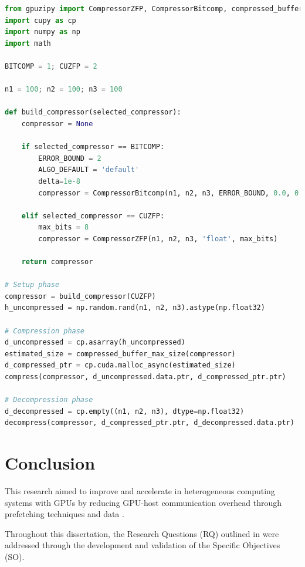 \documentclass[Ingles]{ic-tese-v3}
\begin{document}
\begin{minipage}{\linewidth}
\begin{lstlisting}[language=Python, caption={Example of using GPUZIPY to compress data on the GPU}, label={lst:gpuzipy}]
from gpuzipy import CompressorZFP, CompressorBitcomp, compressed_buffer_size, compressed_buffer_max_size, compress, decompress
import cupy as cp
import numpy as np
import math

BITCOMP = 1; CUZFP = 2

n1 = 100; n2 = 100; n3 = 100

def build_compressor(selected_compressor):
    compressor = None

    if selected_compressor == BITCOMP: 
        ERROR_BOUND = 2
        ALGO_DEFAULT = 'default'
        delta=1e-8
        compressor = CompressorBitcomp(n1, n2, n3, ERROR_BOUND, 0.0, 0.0, delta, 'float', ALGO_DEFAULT)
    
    elif selected_compressor == CUZFP:
        max_bits = 8
        compressor = CompressorZFP(n1, n2, n3, 'float', max_bits)

    return compressor

# Setup phase
compressor = build_compressor(CUZFP)
h_uncompressed = np.random.rand(n1, n2, n3).astype(np.float32)

# Compression phase
d_uncompressed = cp.asarray(h_uncompressed)
estimated_size = compressed_buffer_max_size(compressor)
d_compressed_ptr = cp.cuda.malloc_async(estimated_size)
compress(compressor, d_uncompressed.data.ptr, d_compressed_ptr.ptr)

# Decompression phase
d_decompressed = cp.empty((n1, n2, n3), dtype=np.float32)
decompress(compressor, d_compressed_ptr.ptr, d_decompressed.data.ptr)
\end{lstlisting}
\end{minipage}

\chapter{Conclusion}
\label{ch:conclusion}

This research aimed to improve and accelerate \checkpointing in heterogeneous computing systems with GPUs by reducing GPU-host communication overhead through prefetching techniques and data \compression.

Throughout this dissertation, the Research Questions (RQ) outlined in  were addressed through the development and validation of the Specific Objectives (SO).
\end{document}
